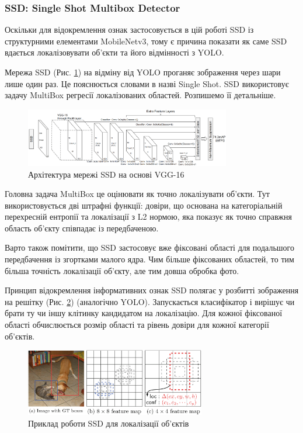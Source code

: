 \subsubsection{SSD: Single Shot Multibox Detector}

Оскільки для відокремлення ознак застосовується в цій роботі SSD із
структурними елементами MobileNetv3, тому є причина показати як саме SSD вдається
локалізовувати об'єкти та його відмінності з YOLO.

Мережа SSD (Рис. \ref{fig:cnn:ssd_architecture}) на відміну від YOLO проганяє зображення
через шари лише один раз. Це пояснюється словами в назві Single Shot. SSD
використовує задачу MultiBox регресії
локалізованих областей. Розпишемо її детальніше.

\begin{figure}[H]
    \centering
    \includegraphics[width=0.8\textwidth]{images/cnn_ssd_architecture}
    \caption{Архітектура мережі SSD на основі VGG-16    \cite{ssd}
        \label{fig:cnn:ssd_architecture}
    }
\end{figure}

Головна задача MultiBox це оцінювати як точно локалізувати об'єкти. Тут використовується
дві штрафні функції: довіри, що основана на категоріальній перехресній ентропії та
локалізації з L2 нормою, яка показує як точно справжня область об'єкту співпадає
із передбаченою.

Варто також помітити, що SSD застосовує вже фіксовані області для подальшого передбачення
із згортками малого ядра.
Чим більше фіксованих областей, то тим більша точність локалізації об'єкту,
але тим довша обробка фото.

Принцип відокремлення інформативних ознак SSD полягає у розбитті зображення на решітку
(Рис. \ref{fig:cnn:ssd_work_example}) (аналогічно YOLO). Запускається класифікатор
і вирішує чи брати ту чи іншу клітинку
кандидатом на локалізацію. Для кожної фіксованої області обчислюється розмір
області та рівень довіри для кожної категорії об'єктів.

\begin{figure}[H]
    \centering
    \includegraphics[width=0.7\textwidth]{images/cnn_ssd_work_example}
    \caption{Приклад роботи SSD для локалізації об'єктів \cite{ssd}
        \label{fig:cnn:ssd_work_example}
    }
\end{figure}


